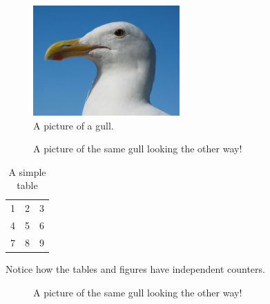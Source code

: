 \documentclass[a4paper,12pt]{article}
\begin{document}
\begin{figure}[h!]
  \caption{A picture of a gull.}
  \centering
    \includegraphics[width=0.5\textwidth]{gull.eps}
\end{figure}
\begin{figure}[h!]
  \centering
  \caption{A picture of the same gull
           looking the other way!}
\end{figure}



\begin{table}[h!]
  \begin{center}
    \begin{tabular}{| l c r |}
    \hline
    1 & 2 & 3 \\
    4 & 5 & 6 \\
    7 & 8 & 9 \\
    \hline
    \end{tabular}
  \end{center}
  \caption{A simple table}
\end{table}

Notice how the tables and figures
have independent counters.

\begin{figure}[h!]
  \centering
  \caption{A picture of the same gull
           looking the other way!}
\end{figure}
\end{document}
